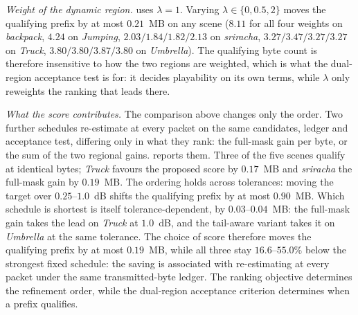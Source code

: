 \documentclass[lettersize,journal]{IEEEtran}
\begin{document}
\emph{Weight of the dynamic region.}  uses $\lambda=1$. Varying
$\lambda\in\{0,0.5,2\}$ moves the qualifying prefix by at most $0.21$~MB on any
scene ($8.11$ for all four weights on \emph{backpack}, $4.24$ on \emph{Jumping},
$2.03/1.84/1.82/2.13$ on \emph{sriracha}, $3.27/3.47/3.27/3.27$ on
\emph{Truck}, $3.80/3.80/3.87/3.80$ on \emph{Umbrella}). The qualifying byte
count is therefore insensitive to how the two regions are weighted, which is what
the dual-region acceptance test is for: it decides playability on its own terms,
while $\lambda$ only reweights the ranking that leads there.

\emph{What the score contributes.} The comparison above changes only the order.
Two further schedules re-estimate at every packet on the same candidates, ledger
and acceptance test, differing only in what they rank: the full-mask gain per byte, or the sum of the two regional gains.
 reports them. Three of the five scenes qualify at identical
bytes; \emph{Truck} favours the proposed score by $0.17$~MB and \emph{sriracha}
the full-mask gain by $0.19$~MB. The ordering holds across tolerances: moving the target over
$0.25$--$1.0$~dB shifts the qualifying prefix by at most $0.90$~MB. Which
schedule is shortest is itself tolerance-dependent, by $0.03$--$0.04$~MB: the
full-mask gain takes the lead on \emph{Truck} at $1.0$~dB, and the tail-aware
variant takes it on \emph{Umbrella} at the same tolerance. The choice of score therefore moves the qualifying
prefix by at most $0.19$~MB, while all three stay $16.6$--$55.0\%$ below the
strongest fixed schedule: the saving is associated with re-estimating at every
packet under the same transmitted-byte ledger. The ranking objective determines
the refinement order, while the dual-region acceptance criterion determines when
a prefix qualifies.
\end{document}
